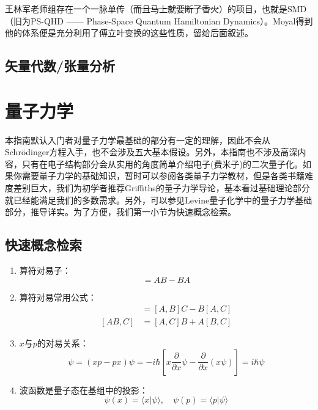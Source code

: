 \documentclass[12pt,a4paper,openany,twoside]{book}
\numberwithin{equation}{section}
\begin{document}
王林军老师组存在一个一脉单传（\sout{而且马上就要断了香火}）的项目，也就是SMD（旧为PS-QHD —— Phase-Space Quantum Hamiltonian Dynamics）。Moyal得到他的体系便是充分利用了傅立叶变换的这些性质，留给后面叙述。

\section{矢量代数/张量分析}


  \chapter{量子力学}
  本指南默认入门者对量子力学最基础的部分有一定的理解，因此不会从Schr\"odinger方程入手，也不会涉及五大基本假设。另外，本指南也不涉及高深内容，只有在电子结构部分会从实用的角度简单介绍电子(费米子)的二次量子化。如果你需要量子力学的基础知识，暂时可以参阅各类量子力学教材，但是各类书籍难度差别巨大，我们为初学者推荐Griffiths的量子力学导论，基本看过基础理论部分就已经能满足我们的多数需求。另外，可以参见Levine量子化学中的量子力学基础部分，推导详实。为了方便，我们第一小节为快速概念检索。

  \section{快速概念检索}
    \begin{enumerate}
    \item 算符对易子：
    \begin{equation}
    [A,B] = AB - BA
    \end{equation}

    \item 算符对易常用公式：
    \begin{align}
    [A,BC]& = [A,B]C - B[A,C]\\
    [AB,C]& = [A,C]B + A[B,C]
    \end{align}

    \item $x$与$p$的对易关系：
    \begin{equation}
    [x,p]\psi=(xp-px)\psi = -i\hbar[x \frac{\partial}{\partial x}\psi-\frac{\partial}{\partial x}(x\psi)]= i\hbar \psi
    \end{equation}

    \item 波函数是量子态在基组中的投影：
    \begin{equation}
    \psi (x) = \langle x | \psi \rangle , \quad \psi(p) = \langle p | \psi \rangle
    \end{equation} 
  \end{enumerate}
  
\end{document}
